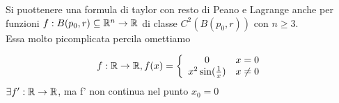 \begin{osservazione}[BDPG,11.14]
  Si pu\aco ottenere una formula di taylor con resto di Peano e Lagrange anche per funzioni $f : B(p_0,r) \subseteq \mathbb{R}^n \to \mathbb{R}$
  di classe $C^2(B(p_0,r))$ con $n \geq 3$.\\
  Essa \ace molto pi\acu complicata perci\aco la omettiamo
\end{osservazione}
\begin{exercise}
  $$f : \mathbb{R} \to \mathbb{R}, f(x) = \left\{\begin{array}{cl}
    0 & x = 0 \\
    x^2 \sin(\frac{1}{x}) & x \neq 0 \\
  \end{array}\right.$$
  $\exists f' : \mathbb{R} \to \mathbb{R}$, ma f' non \ace continua nel punto $x_0=0$
\end{exercise}













